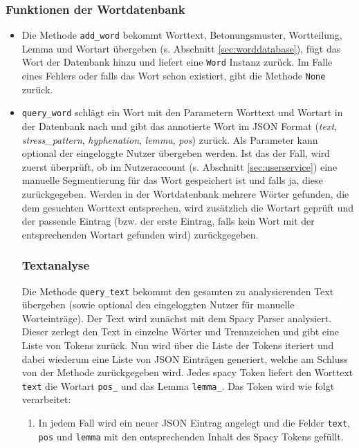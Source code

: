 \subsubsection{Funktionen der Wortdatenbank}
\begin{itemize}
	\item Die Methode \texttt{add\_word} bekommt Worttext, Betonungsmuster, Wortteilung, Lemma und Wortart übergeben (s. Abschnitt \ref{sec:worddatabase}), fügt das Wort der Datenbank hinzu und liefert eine \texttt{Word} Instanz zurück. Im Falle eines Fehlers oder falls das Wort schon existiert, gibt die Methode \texttt{None} zurück.
	
	\item \texttt{query\_word} schlägt ein Wort mit den Parametern Worttext und Wortart in der Datenbank nach und gibt das annotierte Wort im JSON Format (\textit{text}, \textit{stress\_pattern}, \textit{hyphenation}, \textit{lemma}, \textit{pos}) zurück. Als Parameter kann optional der eingeloggte Nutzer übergeben werden. Ist das der Fall, wird zuerst überprüft, ob im Nutzeraccount (s. Abschnitt \ref{sec:userservice}) eine manuelle Segmentierung für das Wort gespeichert ist und falls ja, diese zurückgegeben. Werden in der Wortdatenbank mehrere Wörter gefunden, die dem gesuchten Worttext entsprechen, wird zusätzlich die Wortart geprüft und der passende Eintrag (bzw. der erste Eintrag, falls kein Wort mit der entsprechenden Wortart gefunden wird) zurückgegeben.
	
\subsubsection{Textanalyse}
Die Methode \texttt{query\_text} bekommt den gesamten zu analysierenden Text übergeben (sowie optional den eingeloggten Nutzer für manuelle Worteinträge). Der Text wird zunächst mit dem Spacy Parser analysiert. Dieser zerlegt den Text in einzelne Wörter und Trennzeichen und gibt eine Liste von Tokens zurück. Nun wird über die Liste der Tokens iteriert und dabei wiederum eine Liste von JSON Einträgen generiert, welche am Schluss von der Methode zurückgegeben wird. Jedes spacy Token liefert den Worttext \texttt{text} die Wortart \texttt{pos\_} und das Lemma \texttt{lemma\_}. Das Token wird wie folgt verarbeitet:

\begin{enumerate}
	\item In jedem Fall wird ein neuer JSON Eintrag angelegt und die Felder \texttt{text}, \texttt{pos} und \texttt{lemma} mit den entsprechenden Inhalt des Spacy Tokens gefüllt.
	

\end{enumerate}
\end{itemize}
